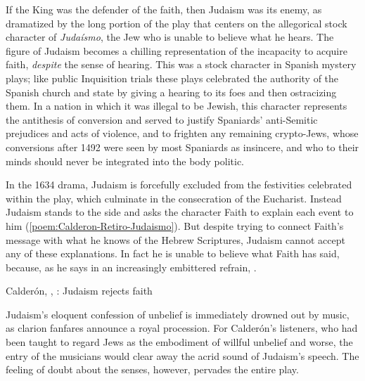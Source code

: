 If the King was the defender of the faith, then Judaism was its enemy, as
dramatized by the long portion of the play that centers on the allegorical
stock character of \emph{Judaísmo}, the Jew who is unable to believe what he
hears.
The figure of Judaism becomes a chilling representation of the incapacity to
acquire faith, \emph{despite} the sense of hearing.
This was a stock character in Spanish mystery plays; like public Inquisition
trials these plays celebrated the authority of the Spanish church and state by
giving a hearing to its foes and then ostracizing them.
In a nation in which it was illegal to be Jewish, this character represents the
antithesis of conversion and served to justify Spaniards' anti-Semitic
prejudices and acts of violence, and to frighten any remaining crypto-Jews,
whose conversions after 1492 were seen by most Spaniards as insincere, and who
to their minds should never be integrated into the body politic.


In the 1634 drama, Judaism is forcefully excluded from the festivities
celebrated within the play, which culminate in the consecration of the
Eucharist.
Instead Judaism stands to the side and asks the character Faith to explain each
event to him (\cref{poem:Calderon-Retiro-Judaismo}).
But despite trying to connect Faith's message with what he knows of the Hebrew
Scriptures, Judaism cannot accept any of these explanations.
In fact he is unable to believe what Faith has said, because, as he says in an
increasingly embittered refrain, .

\begin{poemexample}
    \caption{Calderón, , :
    Judaism rejects faith}
    
    \label{poem:Calderon-Retiro-Judaismo}
\end{poemexample}

Judaism's eloquent confession of unbelief is immediately drowned out by music,
as clarion fanfares announce a royal procession.
For Calderón's listeners, who had been taught to regard Jews as the embodiment
of willful unbelief and worse, the entry of the musicians would clear away the
acrid sound of Judaism's speech.
The feeling of doubt about the senses, however, pervades the entire play.

